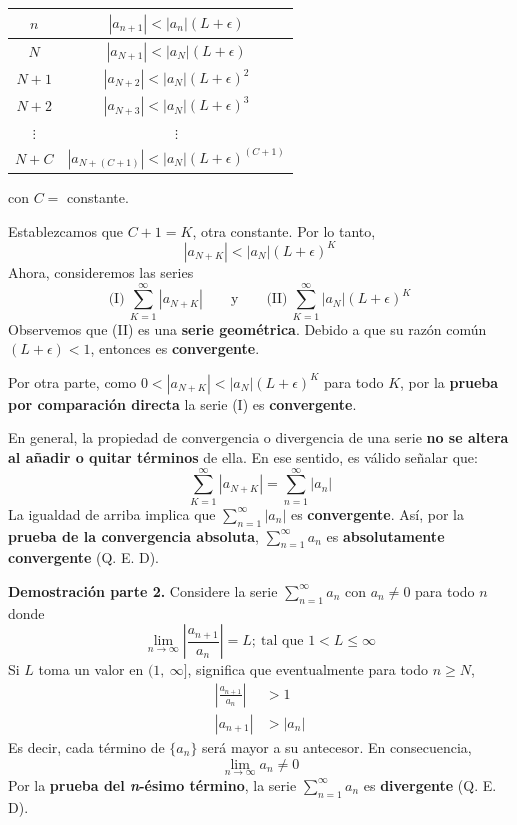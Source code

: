 \documentclass[12pt]{article}
\begin{document}
\begin{table}[!hbt]
\centering

\begin{tabular}{c | c}
$n$ & $|a_{n + 1}| < |a_{n}| (L + \epsilon)$ \\
\hline
    $N$ & $|a_{N + 1}| < |a_{N}| (L + \epsilon)$  \\
$N + 1$ & $|a_{N + 2}| < |a_{N}| (L + \epsilon)^{2}$ \\
$N + 2$ & $|a_{N + 3}| < |a_{N}| (L + \epsilon)^{3}$ \\
$\vdots$ & $\vdots$ \\
$N + C$ & $|a_{N + (C + 1)}| < |a_{N}| (L + \epsilon)^{(C + 1)}$
\end{tabular}

\end{table}

con $C =$ constante.

Establezcamos que $C + 1 = K$, otra constante. Por lo tanto,
\[
  |a_{N + K}| < |a_{N}| (L + \epsilon)^{K}
\]
Ahora, consideremos las series
\[
  \text{(I)} \ \sum_{K = 1}^{\infty} |a_{N + K}|
  \qquad \text{y} \qquad
  \text{(II)} \ \sum_{K = 1}^{\infty} |a_{N}| (L + \epsilon)^{K}
\]
Observemos que (II) es una \textbf{serie geométrica}. Debido a que su razón común $(L + \epsilon) < 1$, entonces es \textbf{convergente}.

Por otra parte, como $0 < |a_{N + K}| < |a_{N}| (L + \epsilon)^{K}$ para todo $K$, por la \textbf{prueba por comparación directa} la serie (I) es \textbf{convergente}.

En general, la propiedad de convergencia o divergencia de una serie \textbf{no se altera al añadir o quitar términos} de ella. En ese sentido, es válido señalar que:
\[
  \sum_{K = 1}^{\infty} |a_{N + K}| = \sum_{n = 1}^{\infty} |a_{n}|
\]
La igualdad de arriba implica que $\sum_{n = 1}^{\infty} |a_{n}|$ es \textbf{convergente}. Así, por la \textbf{prueba de la convergencia absoluta}, $\sum_{n = 1}^{\infty} a_{n}$ es \textbf{absolutamente convergente} (Q. E. D).

\textbf{Demostración parte 2.} Considere la serie $\sum_{n = 1}^{\infty} a_{n}$ con $a_{n} \neq 0$ para todo $n$ donde
\[
  \lim_{n \to \infty} \left|\frac{a_{n + 1}}{a_{n}}\right| = L; \ \text{tal que } 1 < L \leq \infty
\]
Si $L$ toma un valor en $(1, \ \infty]$, significa que eventualmente para todo $n \geq N$,
\begin{align*}
  \left|\frac{a_{n + 1}}{a_{n}}\right| &> 1 \\
                           |a_{n + 1}| &> |a_{n}|
\end{align*}
Es decir, cada término de $\{a_{n}\}$ será mayor a su antecesor. En consecuencia,
\[
  \lim_{n \to \infty} a_{n} \neq 0
\]
Por la \textbf{prueba del \textit{n}-ésimo término}, la serie $\sum_{n = 1}^{\infty} a_{n}$ es \textbf{divergente} (Q. E. D).
\end{document}
